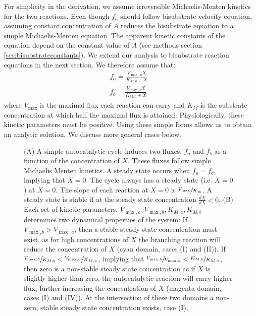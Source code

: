 For simplicity in the derivation, we assume irreversible Michaelis-Menten kinetics for the two reactions.
Even though $f_a$ should follow bisubstrate velocity equation, assuming constant concentration of $A$ reduces the bisubstrate equation to a simple Michaelis-Menten equation.
The apparent kinetic constants of the equation depend on the constant value of $A$ (see methods section \ref{sec:bisubstrateconstants}).
We extend our analysis to bisubstrate reaction equations in the next section.
We therefore assume that:
    \begin{eqnarray*}
      f_a = \frac{V_{\max,a}X}{K_{M,a}+X} \\
      f_b = \frac{V_{\max,b}X}{K_{M,b}+X}
    \end{eqnarray*}
    where $V_{\max}$ is the maximal flux each reaction can carry and $K_M$ is the substrate concentration at which half the maximal flux is attained.
    Physiologically, these kinetic parameters must be positive.
    Using these simple forms allows us to obtain an analytic solution.
    We discuss more general cases below.
    \begin{figure}[!htb]
\iftoggle{elifesubmission} { }
{
      
}
      \caption{\label{fig:simplecycle}
        (A) A simple autocatalytic cycle induces two fluxes, $f_a$ and $f_b$ as a function of the concentration of $X$.
        These fluxes follow simple Michaelis Menten kinetics.
        A steady state occurs when $f_a=f_b$, implying that $\dot{X}=0$.
        The cycle always has a steady state (i.e. $\dot{X}=0$) at $X=0$.
        The slope of each reaction at $X=0$ is $\sfrac{V_{\max}}{K_m}$.
        A steady state is stable if at the steady state concentration $\frac{d\dot{X}}{dX}<0$.
        (B) Each set of kinetic parameters, $V_{\max,a},V_{\max,b},K_{M,a},K_{M,b}$ determines two dynamical properties of the system:
        If $V_{\max,b}>V_{\max,a}$, then a stable steady state concentration must exist, as for high concentrations of $X$ the branching reaction will reduce the concentration of $X$ (cyan domain, cases (I) and (II)).
        If $\sfrac{V_{\max,b}}{K_{M,b}}<\sfrac{V_{\max,a}}{K_{M,a}}$, implying that $\sfrac{V_{\max,b}}{V_{\max,a}}<\sfrac{K_{M,b}}{K_{M,a}}$, then zero is a non-stable steady state concentration as if $X$ is slightly higher than zero, the autocatalytic reaction will carry higher flux, further increasing the concentration of $X$ (magenta domain, cases (I) and (IV)).
    At the intersection of these two domains a non-zero, stable steady state concentration exists, case (I).}
    \end{figure}

